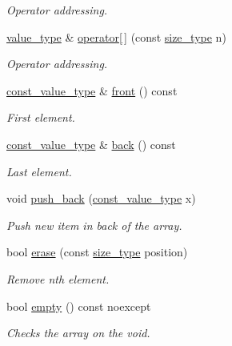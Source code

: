 \begin{DoxyCompactItemize}
\begin{DoxyCompactList}\small\item\em Operator addressing. \end{DoxyCompactList}\item 
\hyperlink{classatom_1_1array__t_aeb485cd6190dc11ddb8e7f48c09451c4}{value\+\_\+type} \& \hyperlink{classatom_1_1array__t_ad96738ee0018dce88aaeb9941c24dee0}{operator\mbox{[}$\,$\mbox{]}} (const \hyperlink{classatom_1_1array__t_a8534f23c7f0082698cbd708e1f2e26ff}{size\+\_\+type} n)
\begin{DoxyCompactList}\small\item\em Operator addressing. \end{DoxyCompactList}\item 
\hyperlink{classatom_1_1array__t_a9c33ee3fb4e5b4d57c7801a8f69ada14}{const\+\_\+value\+\_\+type} \& \hyperlink{classatom_1_1array__t_a3ef0f195a147615aa53a3e2a47c61c49}{front} () const
\begin{DoxyCompactList}\small\item\em First element. \end{DoxyCompactList}\item 
\hyperlink{classatom_1_1array__t_a9c33ee3fb4e5b4d57c7801a8f69ada14}{const\+\_\+value\+\_\+type} \& \hyperlink{classatom_1_1array__t_a2337c7353a06e7df164112021138f7fd}{back} () const
\begin{DoxyCompactList}\small\item\em Last element. \end{DoxyCompactList}\item 
void \hyperlink{classatom_1_1array__t_ad53d9e0a290e125927d70c202b04aea4}{push\+\_\+back} (\hyperlink{classatom_1_1array__t_a9c33ee3fb4e5b4d57c7801a8f69ada14}{const\+\_\+value\+\_\+type} x)
\begin{DoxyCompactList}\small\item\em Push new item in back of the array. \end{DoxyCompactList}\item 
bool \hyperlink{classatom_1_1array__t_a2d07b56eadfc3c1aed378d918366f859}{erase} (const \hyperlink{classatom_1_1array__t_a8534f23c7f0082698cbd708e1f2e26ff}{size\+\_\+type} position)
\begin{DoxyCompactList}\small\item\em Remove nth element. \end{DoxyCompactList}\item 
bool \hyperlink{classatom_1_1array__t_aac24cc1d7dab76ac0bf394aaa8699e27}{empty} () const noexcept
\begin{DoxyCompactList}\small\item\em Checks the array on the void. \end{DoxyCompactList}\item 

\end{DoxyCompactItemize}
